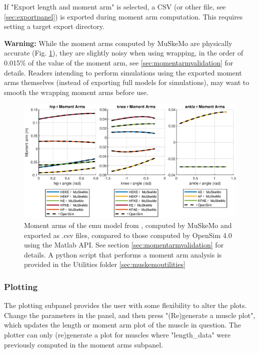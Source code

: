 \documentclass{article}
\begin{document}
If "Export length and moment arm" is selected, a CSV (or other file, see \ref{sec:exportpanel}) is exported during moment arm computation. This requires setting a target export directory.

\textbf{Warning:} While the moment arms computed by MuSkeMo are physically accurate (Fig. \ref{fig:momentarmscombined}), they are slightly noisy when using wrapping, in the order of 0.015\% of the value of the moment arm, see \ref{sec:momentarmvalidation} for details. Readers intending to perform simulations using the exported moment arms themselves (instead of exporting full models for simulations), may want to smooth the wrapping moment arms before use.

\begin{figure}[htbp]
    \centering
    \includegraphics[width=1\textwidth]{figures/HKA_momentarms_emu.eps} %
    \caption{Moment arms of the emu model from \cite{vanbijlertMusclecontrolledPhysicsSimulations2024a}, computed by MuSkeMo and exported as .csv files, compared to those computed by OpenSim 4.0 using the Matlab API. See section \ref{sec:momentarmvalidation} for details. A python script that performs a moment arm analysis is provided in the Utilities folder \ref{sec:muskemoutilities}}
    \label{fig:momentarmscombined}
\end{figure}

\subsubsection{Plotting}
\label{sec:plotting}

The plotting subpanel provides the user with some flexibility to alter the plots. Change the parameters in the panel, and then press "(Re)generate a muscle plot", which updates the length or moment arm plot of the muscle in question. The plotter can only (re)generate a plot for muscles where "length\_data" were previously computed in the moment arms subpanel.
\end{document}
